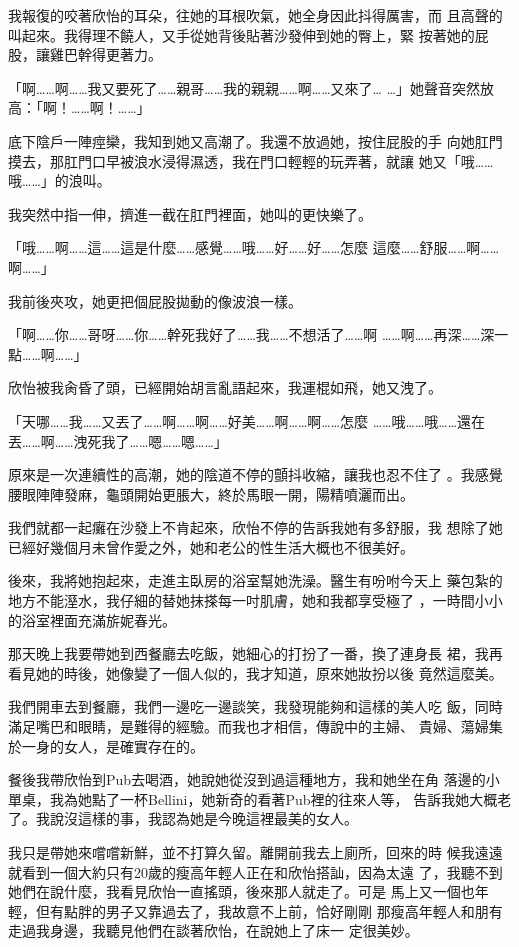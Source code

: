我報復的咬著欣怡的耳朵，往她的耳根吹氣，她全身因此抖得厲害，而
且高聲的叫起來。我得理不饒人，又手從她背後貼著沙發伸到她的臀上，緊
按著她的屁股，讓雞巴幹得更著力。

「啊……啊……我又要死了……親哥……我的親親……啊……又來了…
…」她聲音突然放高：「啊！……啊！……」

底下陰戶一陣痙欒，我知到她又高潮了。我還不放過她，按住屁股的手
向她肛門摸去，那肛門口早被浪水浸得濕透，我在門口輕輕的玩弄著，就讓
她又「哦……哦……」的浪叫。

我突然中指一伸，擠進一截在肛門裡面，她叫的更快樂了。

「哦……啊……這……這是什麼……感覺……哦……好……好……怎麼
這麼……舒服……啊……啊……」

我前後夾攻，她更把個屁股拋動的像波浪一樣。

「啊……你……哥呀……你……幹死我好了……我……不想活了……啊
……啊……再深……深一點……啊……」

欣怡被我肏昏了頭，已經開始胡言亂語起來，我運棍如飛，她又洩了。

「天哪……我……又丟了……啊……啊……好美……啊……啊……怎麼
……哦……哦……還在丟……啊……洩死我了……嗯……嗯……」

原來是一次連續性的高潮，她的陰道不停的顫抖收縮，讓我也忍不住了
。我感覺腰眼陣陣發麻，龜頭開始更脹大，終於馬眼一開，陽精噴灑而出。

我們就都一起癱在沙發上不肯起來，欣怡不停的告訴我她有多舒服，我
想除了她已經好幾個月未曾作愛之外，她和老公的性生活大概也不很美好。

後來，我將她抱起來，走進主臥房的浴室幫她洗澡。醫生有吩咐今天上
藥包紮的地方不能溼水，我仔細的替她抹搽每一吋肌膚，她和我都享受極了
，一時間小小的浴室裡面充滿旂妮春光。

那天晚上我要帶她到西餐廳去吃飯，她細心的打扮了一番，換了連身長
裙，我再看見她的時後，她像變了一個人似的，我才知道，原來她妝扮以後
竟然這麼美。

我們開車去到餐廳，我們一邊吃一邊談笑，我發現能夠和這樣的美人吃
飯，同時滿足嘴巴和眼睛，是難得的經驗。而我也才相信，傳說中的主婦、
貴婦、蕩婦集於一身的女人，是確實存在的。

餐後我帶欣怡到Pub去喝酒，她說她從沒到過這種地方，我和她坐在角
落邊的小單桌，我為她點了一杯Bellini，她新奇的看著Pub裡的往來人等，
告訴我她大概老了。我說沒這樣的事，我認為她是今晚這裡最美的女人。

我只是帶她來嚐嚐新鮮，並不打算久留。離開前我去上廁所，回來的時
候我遠遠就看到一個大約只有20歲的瘦高年輕人正在和欣怡搭訕，因為太遠
了，我聽不到她們在說什麼，我看見欣怡一直搖頭，後來那人就走了。可是
馬上又一個也年輕，但有點胖的男子又靠過去了，我故意不上前，恰好剛剛
那瘦高年輕人和朋有走過我身邊，我聽見他們在談著欣怡，在說她上了床一
定很美妙。

